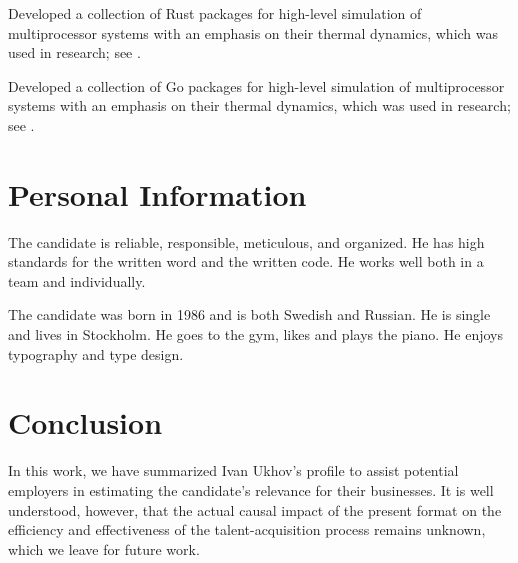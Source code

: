 \documentclass[journal]{IEEEtran}
\begin{document}
\emph{} Developed a collection of Rust packages for high-level simulation of
multiprocessor systems with an emphasis on their thermal dynamics, which was
used in research; see .

\emph{} Developed a collection of Go packages for
high-level simulation of multiprocessor systems with an emphasis on their
thermal dynamics, which was used in research; see .

\section{Personal Information} 

The candidate is reliable, responsible, meticulous, and organized. He has high
standards for the written word and the written code. He works well both in a
team and individually.

The candidate was born in 1986 and is both Swedish and Russian. He is single and
lives in Stockholm. He goes to the gym, likes
 and plays the
piano. He enjoys typography and type design.

\section{Conclusion} 

In this work, we have summarized Ivan Ukhov's profile to assist potential
employers in estimating the candidate's relevance for their businesses. It is
well understood, however, that the actual causal impact of the present format on
the efficiency and effectiveness of the talent-acquisition process remains
unknown, which we leave for future work.

\begingroup
  
  
\endgroup
\end{document}
